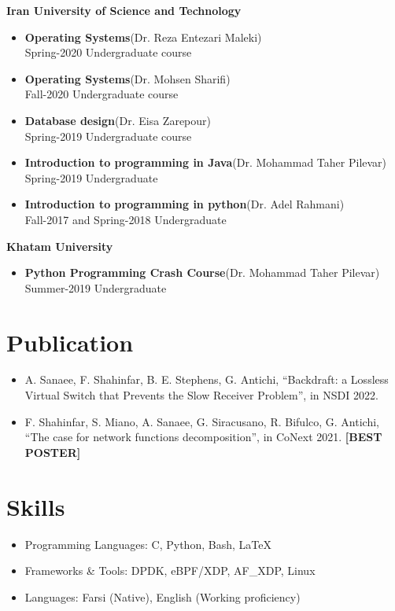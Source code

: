 \documentclass[11pt]{article}
\newcommand*{\taRecord}[4]{\textbf{#1}\quad (#3) \\ #2 \quad  #4}
\begin{document}
\noindent \textbf{Iran University of Science and Technology} \par
{
    \renewcommand\labelitemi{}
    \begin{itemize}[noitemsep,topsep=0pt,parsep=0pt,partopsep=0pt]
		\item \taRecord{Operating Systems}
			{Spring-2020}
			{Dr. Reza Entezari Maleki}
			{Undergraduate course}
		\item \taRecord{Operating Systems}
			{Fall-2020}
			{Dr. Mohsen Sharifi}
			{Undergraduate course}
		\item \taRecord{Database design}
			{Spring-2019}
			{Dr. Eisa Zarepour}
			{Undergraduate course}
		\item \taRecord{Introduction to programming in Java}
			{Spring-2019}
			{Dr. Mohammad Taher Pilevar}
			{Undergraduate}
		\item \taRecord{Introduction to programming in python}
			{Fall-2017 and Spring-2018}
			{Dr. Adel Rahmani}
			{Undergraduate}
    \end{itemize}
}

{
\renewcommand\labelitemi{}
\noindent \textbf{Khatam University} \par
\begin{itemize}[noitemsep,topsep=0pt,parsep=0pt,partopsep=0pt]
	\item \taRecord{Python Programming Crash Course}
		{Summer-2019}
		{Dr. Mohammad Taher Pilevar}
		{Undergraduate}
\end{itemize}
}

\section {Publication}
\begin{itemize}
    \item A. Sanaee, F. Shahinfar, B. E. Stephens, G. Antichi, ``Backdraft: a Lossless Virtual Switch that
        Prevents the Slow Receiver Problem'', in NSDI 2022.

    \item F. Shahinfar, S. Miano, A. Sanaee, G. Siracusano, R. Bifulco, G. Antichi,
        ``The case for network functions decomposition'', in CoNext 2021. \textbf{[BEST POSTER]}
\end{itemize}

\section{Skills}
\begin{itemize}[noitemsep,topsep=0pt,parsep=0pt,partopsep=0pt]
	\item {Programming Languages: C, Python, Bash, \LaTeX}
	\item {Frameworks \& Tools: DPDK, eBPF/XDP, AF\_XDP, Linux}
	\item {Languages: Farsi (Native), English (Working proficiency)}
\end{itemize}
\end{document}
